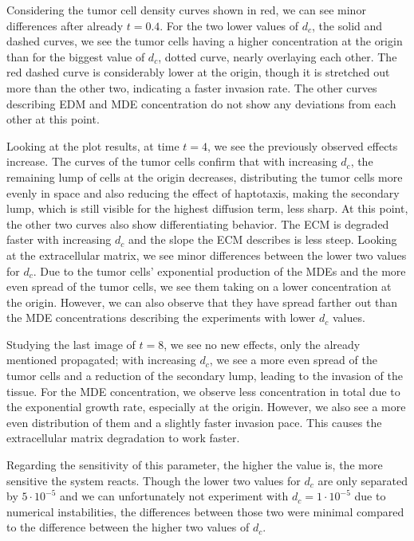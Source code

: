 Considering the tumor cell density curves shown in red, we can see minor differences after already $t=0.4$. For the two lower values of $d_c$, the solid and dashed curves, we see the tumor cells having a higher concentration at the origin than for the biggest value of $d_c$, dotted curve, nearly overlaying each other. The red dashed curve is considerably lower at the origin, though it is stretched out more than the other two, indicating a faster invasion rate. The other curves describing EDM and MDE concentration do not show any deviations from each other at this point.

Looking at the plot results, at time $t=4$, we see the previously observed effects increase. The curves of the tumor cells confirm that with increasing $d_c$, the remaining lump of cells at the origin decreases, distributing the tumor cells more evenly in space and also reducing the effect of haptotaxis, making the secondary lump, which is still visible for the highest diffusion term, less sharp. At this point, the other two curves also show differentiating behavior. The ECM is degraded faster with increasing $d_c$ and the slope the ECM describes is less steep. Looking at the extracellular matrix, we see minor differences between the lower two values for $d_c$. Due to the tumor cells' exponential production of the MDEs and the more even spread of the tumor cells, we see them taking on a lower concentration at the origin. However, we can also observe that they have spread farther out than the MDE concentrations describing the experiments with lower $d_c$ values.

Studying the last image of $t=8$, we see no new effects, only the already mentioned propagated; with increasing $d_c$, we see a more even spread of the tumor cells and a reduction of the secondary lump, leading to the invasion of the tissue. For the MDE concentration, we observe less concentration in total due to the exponential growth rate, especially at the origin. However, we also see a more even distribution of them and a slightly faster invasion pace. This causes the extracellular matrix degradation to work faster.

Regarding the sensitivity of this parameter, the higher the value is, the more sensitive the system reacts. Though the lower two values for $d_c$ are only separated by $5\cdot 10^{-5}$ and we can unfortunately not experiment with $d_c=1 \cdot 10^{-5}$ due to numerical instabilities, the differences between those two were minimal compared to the difference between the higher two values of $d_c$.

